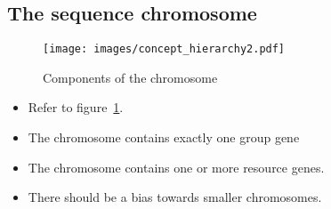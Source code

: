 \subsection{The sequence chromosome}
\begin{figure}[h!]
	\centering
	\texttt{[image: images/concept\_hierarchy2.pdf]}
	\caption[Components of the chromosome]{Components of the chromosome}
	\label{fig:chromosome_components}
\end{figure}
\begin{itemize}
	\item Refer to figure~\ref{fig:chromosome_components}.
	\item The chromosome contains exactly one group gene
	\item The chromosome contains one or more resource genes.
	\item There should be a bias towards smaller chromosomes.
\end{itemize}
